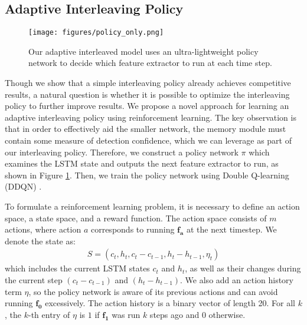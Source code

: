 \documentclass[10pt,twocolumn,letterpaper]{article}
\newcommand\todo[1]{\textcolor{red}{#1}}
\begin{document}
\subsection{Adaptive Interleaving Policy}
\label{sec:3.4}
\begin{figure}[t]
\begin{center}
  \texttt{[image: figures/policy\_only.png]}
\end{center}
\vspace{-1em}
  \caption{Our adaptive interleaved model uses an ultra-lightweight policy network to decide which feature extractor to run at each time step.}
\label{fig:rl}
\end{figure}

Though we show that a simple interleaving policy already achieves competitive results, a natural question is whether it is possible to optimize the interleaving policy to further improve results. We propose a novel approach for learning an adaptive interleaving policy using reinforcement learning. The key observation is that in order to effectively aid the smaller network, the memory module must contain some measure of detection confidence, which we can leverage as part of our interleaving policy. Therefore, we construct a policy network $\pi$ which examines the LSTM state and outputs the next feature extractor to run, as shown in Figure \ref{fig:rl}. Then, we train the policy network using Double Q-learning (DDQN) \cite{van2016deep}.

To formulate a reinforcement learning problem, it is necessary to define an action space, a state space, and a reward function. The action space consists of $m$ actions, where action $a$ corresponds to running $\mathbf{f_a}$ at the next timestep. We denote the state as:
\begin{align}
    S = (c_t, h_t, c_t - c_{t-1}, h_t - h_{t-1}, \eta_t)
\end{align}
which includes the current LSTM states $c_t$ and $h_t$, as well as their changes during the current step $(c_t - c_{t-1})$ and $(h_t - h_{t-1})$. We also add an action history term $\eta$, so the policy network is aware of its previous actions and can avoid running $\mathbf{f_0}$ excessively. The action history is a binary vector of length 20. For all $k$, the $k$-th entry of $\eta$ is $1$ if $\mathbf{f_1}$ was run $k$ steps ago and $0$ otherwise. \todo{}
\end{document}
